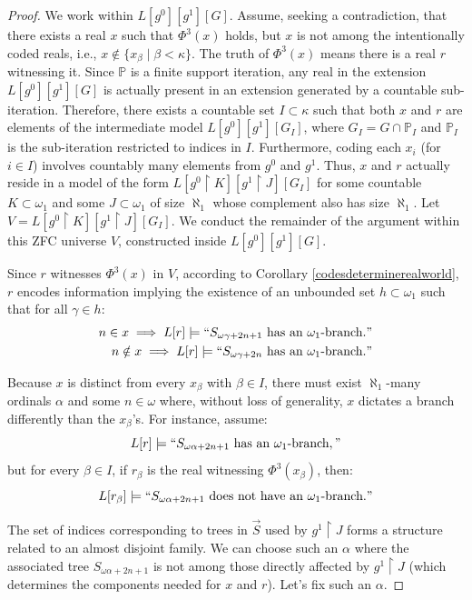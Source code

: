 \documentclass[a4paper,11pt]{article}
\newcommand{\forceP}{\mathbb{P}}
\begin{document}
\begin{proof}
We work within $L[g^0][g^1][G]$. Assume, seeking a contradiction, that there exists a real $x$ such that $\Phi^3(x)$ holds, but $x$ is not among the intentionally coded reals, i.e., $x \notin \{x_{\beta} \mid \beta < \kappa\}$.
The truth of $\Phi^3(x)$ means there is a real $r$ witnessing it. Since $\forceP$ is a finite support iteration, any real in the extension $L[g^0][g^1][G]$ is actually present in an extension generated by a countable sub-iteration. Therefore, there exists a countable set $I \subset \kappa$ such that both $x$ and $r$ are elements of the intermediate model $L[g^0][g^1][G_I]$, where $G_I = G \cap \forceP_I$ and $\forceP_I$ is the sub-iteration restricted to indices in $I$.
Furthermore, coding each $x_i$ (for $i \in I$) involves countably many elements from $g^0$ and $g^1$. Thus, $x$ and $r$ actually reside in a model of the form $L[g^0 \upharpoonright K][g^1 \upharpoonright J][G_I]$ for some countable $K \subset \omega_1$ and some $J \subset \omega_1$ of size $\aleph_1$ whose complement also has size $\aleph_1$. Let $V = L[g^0 \upharpoonright K][g^1 \upharpoonright J][G_I]$. We conduct the remainder of the argument within this ZFC universe $V$, constructed inside $L[g^0][g^1][G]$.

Since $r$ witnesses $\Phi^3(x)$ in $V$, according to Corollary \ref{codesdeterminerealworld}, $r$ encodes information implying the existence of an unbounded set $h \subset \omega_1$ such that for all $\gamma \in h$:
\begin{align*}
n \in x \implies L[r] \models ``S_{\omega \gamma + 2n+1} \text{ has an } \omega_1\text{-branch}." \\
n \notin x \implies L[r] \models ``S_{\omega \gamma + 2n} \text{ has an } \omega_1\text{-branch}."
\end{align*}

Because $x$ is distinct from every $x_{\beta}$ with $\beta \in I$, there must exist $\aleph_1$-many ordinals $\alpha$ and some $n \in \omega$ where, without loss of generality, $x$ dictates a branch differently than the $x_\beta$'s. For instance, assume:
\[ L[r] \models ``S_{\omega \alpha + 2n+1} \text{ has an } \omega_1\text{-branch}," \]
but for every $\beta \in I$, if $r_{\beta}$ is the real witnessing $\Phi^3(x_{\beta})$, then:
\[ L[r_{\beta}] \models ``S_{\omega \alpha + 2n+1} \text{ does not have an } \omega_1\text{-branch}." \]

The set of indices corresponding to trees in $\vec{S}$ used by $g^1 \upharpoonright J$ forms a structure related to an almost disjoint family. We can choose such an $\alpha$ where the associated tree $S_{\omega \alpha + 2n+1}$ is not among those directly affected by $g^1 \upharpoonright J$ (which determines the components needed for $x$ and $r$). Let's fix such an $\alpha$.


\end{proof}
\end{document}
